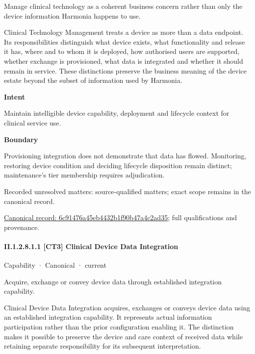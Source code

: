 Manage clinical technology as a coherent business concern rather than only the device information Harmonia happens to use.



Clinical Technology Management treats a device as more than a data endpoint. Its responsibilities distinguish what device exists, what functionality and release it has, where and to whom it is deployed, how authorised users are supported, whether exchange is provisioned, what data is integrated and whether it should remain in service. These distinctions preserve the business meaning of the device estate beyond the subset of information used by Harmonia.



\textbf{Intent}



Maintain intelligible device capability, deployment and lifecycle context for clinical service use.



\textbf{Boundary}



Provisioning integration does not demonstrate that data has flowed. Monitoring, restoring device condition and deciding lifecycle disposition remain distinct; maintenance's tier membership requires adjudication.


{\small Recorded unresolved matters: source-qualified matters; exact scope remains in the canonical record.}\par
{\footnotesize \href{../../../../continuum/strategy/capability/6c91476a45eb4432b1f90b47a4c2ad35.md}{Canonical record: 6c91476a45eb4432b1f90b47a4c2ad35}; full qualifications and provenance.}\par
\paragraph*{II.1.2.8.1.1 [CT3] Clinical Device Data Integration}
\label{navigation:II.1.2.8.1.1}

\label{element:382a6fe3546f491f940cba1c1e5df5ef}
{\small Capability · Canonical · current}\par

Acquire, exchange or convey device data through established integration capability.



Clinical Device Data Integration acquires, exchanges or conveys device data using an established integration capability. It represents actual information participation rather than the prior configuration enabling it. The distinction makes it possible to preserve the device and care context of received data while retaining separate responsibility for its subsequent interpretation.




